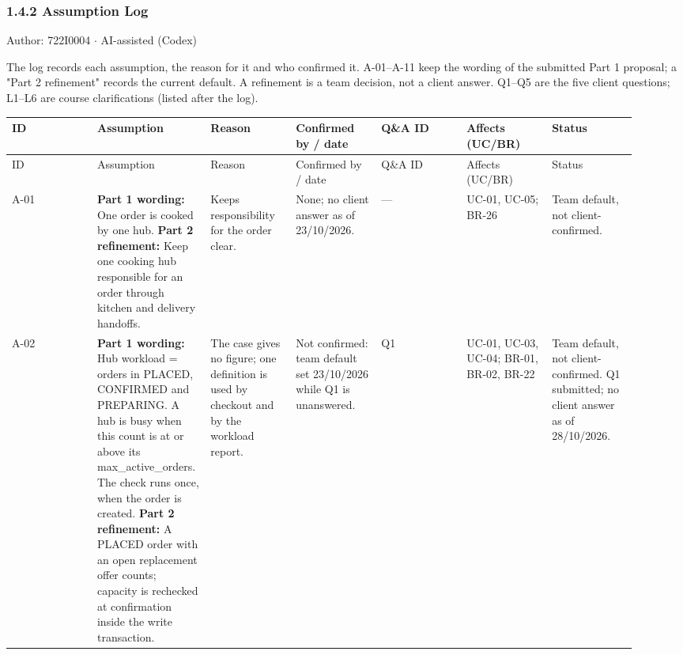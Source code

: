\subsubsection*{1.4.2 Assumption Log}
Author: 722I0004 \ensuremath{\cdot} AI-assisted (Codex)

The log records each assumption, the reason for it and who confirmed it. A-01--A-11 keep the wording of the submitted Part 1 proposal; a "Part 2 refinement" records the current default. A refinement is a team decision, not a client answer. Q1--Q5 are the five client questions; L1--L6 are course clarifications (listed after the log).

\begin{landscape}
\begingroup\footnotesize
\begin{longtable}{>{\raggedright\arraybackslash}p{0.1314\linewidth}>{\raggedright\arraybackslash}p{0.1314\linewidth}>{\raggedright\arraybackslash}p{0.1314\linewidth}>{\raggedright\arraybackslash}p{0.1314\linewidth}>{\raggedright\arraybackslash}p{0.1314\linewidth}>{\raggedright\arraybackslash}p{0.1314\linewidth}>{\raggedright\arraybackslash}p{0.1314\linewidth}}
ID & Assumption & Reason & Confirmed by / date & Q\&A ID & Affects (UC/BR) & Status \\
\hline\endfirsthead
ID & Assumption & Reason & Confirmed by / date & Q\&A ID & Affects (UC/BR) & Status \\
\hline\endhead
A-01 & \textbf{Part 1 wording:} One order is cooked by one hub. \newline{} \textbf{Part 2 refinement:} Keep one cooking hub responsible for an order through kitchen and delivery handoffs. & Keeps responsibility for the order clear. & None; no client answer as of 23/10/2026. & --- & UC-01, UC-05; BR-26 & Team default, not client-confirmed. \\
A-02 & \textbf{Part 1 wording:} Hub workload = orders in PLACED, CONFIRMED and PREPARING. A hub is busy when this count is at or above its max\_active\_orders. The check runs once, when the order is created. \newline{} \textbf{Part 2 refinement:} A PLACED order with an open replacement offer counts; capacity is rechecked at confirmation inside the write transaction. & The case gives no figure; one definition is used by checkout and by the workload report. & Not confirmed: team default set 23/10/2026 while Q1 is unanswered. & Q1 & UC-01, UC-03, UC-04; BR-01, BR-02, BR-22 & Team default, not client-confirmed. Q1 submitted; no client answer as of 28/10/2026. \\

\end{longtable}
\end{landscape}
